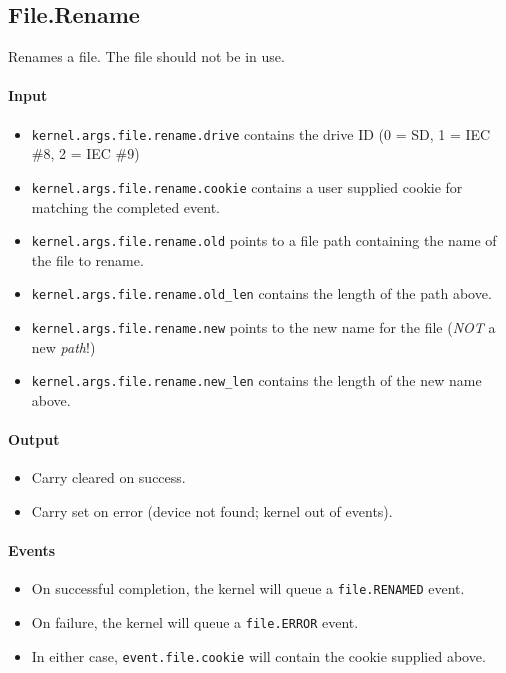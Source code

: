 \subsection*{File.Rename}
Renames a file.  The file should not be in use.

\paragraph{Input}
\begin{itemize}
\item \verb+kernel.args.file.rename.drive+ contains the drive ID (0 = SD, 1 = IEC \#8, 2 = IEC \#9)
\item \verb+kernel.args.file.rename.cookie+ contains a user supplied cookie for matching the completed event.
\item \verb+kernel.args.file.rename.old+ points to a file path containing the name of the file to rename.
\item \verb+kernel.args.file.rename.old_len+ contains the length of the path above.
\item \verb+kernel.args.file.rename.new+ points to the new name for the file ({\em NOT} a new {\em path}!)
\item \verb+kernel.args.file.rename.new_len+ contains the length of the new name above.
\end{itemize}

\paragraph{Output}
\begin{itemize}
\item Carry cleared on success.
\item Carry set on error (device not found; kernel out of events).
\end{itemize}

\paragraph{Events}
\begin{itemize}
\item On successful completion, the kernel will queue a \verb+file.RENAMED+ event.
\item On failure, the kernel will queue a \verb+file.ERROR+ event.
\item In either case, \verb+event.file.cookie+ will contain the cookie supplied above.
\end{itemize}

